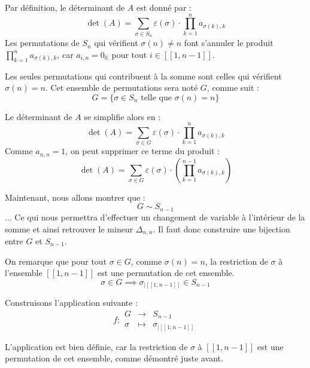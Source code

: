 \documentclass[11pt, a4paper]{article}
\theoremstyle{definition}
\begin{document}
Par définition, le déterminant de $A$ est donné par :
$$\det(A) = \sum_{\sigma \in S_n} \varepsilon(\sigma) \cdot \prod_{k=1}^{n} a_{\sigma(k), k}$$
Les permutations de $S_n$ qui vérifient $\sigma(n) \ne n$ font s'annuler le produit $\prod_{k=1}^{n} a_{\sigma(k), k}$, car $a_{i,n} = 0_\mathbb{K}$ pour tout $i \in [\![1,n-1]\!]$.

Les seules permutations qui contribuent à la somme sont celles qui vérifient $\sigma(n) = n$. Cet ensemble de permutations sera noté $G$, comme suit :
$$G = \{\sigma \in S_n \text{ telle que } \sigma(n) = n\}$$

Le déterminant de $A$ se simplifie alors en :
$$\det(A) = \sum_{\sigma \in G} \varepsilon(\sigma) \cdot \prod_{k=1}^{n} a_{\sigma(k), k}$$
Comme $a_{n,n} = 1$, on peut supprimer ce terme du produit :
$$\det(A) = \sum_{\sigma \in G} \varepsilon(\sigma) \cdot \left(\prod_{k=1}^{n-1} a_{\sigma(k), k}\right)$$

Maintenant, nous allons montrer que :
$$G \sim S_{n-1}$$
... Ce qui nous permettra d'effectuer un changement de variable à l'intérieur de la somme et ainsi retrouver le mineur $\Delta_{n,n}$. Il faut donc construire une bijection entre $G$ et $S_{n-1}$.

On remarque que pour tout $\sigma \in G$, comme $\sigma(n) = n$, la restriction de $\sigma$ à l'ensemble $[\![1,n-1]\!]$ est une permutation de cet ensemble.
$$\sigma \in G \implies \sigma_{|[\![1,n-1]\!]} \in S_{n-1}$$

Construisons l'application suivante :
$$f : \begin{matrix} G & \to & S_{n-1} \\ \sigma & \mapsto & \sigma_{|[\![1,n-1]\!]} \end{matrix}$$

L'application est bien définie, car la restriction de $\sigma$ à $[\![1,n-1]\!]$ est une permutation de cet ensemble, comme démontré juste avant.
\end{document}
